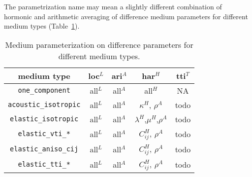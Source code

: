 The parametrization name may mean a slightly different combination of hormonic and arithmetic
averaging of difference medium parameters for different medium types (Table~\ref{table_parameterization}).

\begin{table}[h!]
\centering
\caption{Medium parameterization on difference parameters for different medium types.}
\label{table_parameterization}
\begin{tabular}{| c | c | c | c | c |}
\hline
   medium type               &   loc$^L$   &   ari$^A$   & har$^H$  & tti$^T$ \\
\hline
   \verb|one_component|      &    all$^L$  &   all$^A$   & all$^H$  &  NA \\
\hline
   \verb|acoustic_isotropic| &    all$^L$  &   all$^A$   &$\kappa^H$, $\rho^A$ & todo \\
\hline
   \verb|elastic_isotropic|  &    all$^L$  &   all$^A$   &$\lambda^H$,$\mu^H$,$\rho^A$ &  todo \\
\hline
   \verb|elastic_vti_*|      &    all$^L$  &   all$^A$   &$C_{ij}^H$, $\rho^A$ & todo \\
\hline
   \verb|elastic_aniso_cij|  &    all$^L$  &   all$^A$   &$C_{ij}^H$, $\rho^A$ & todo \\
\hline
   \verb|elastic_tti_*|      &    all$^L$  &   all$^A$   &$C_{ij}^H$, $\rho^A$ & todo \\
\hline
\end{tabular}
\end{table}



